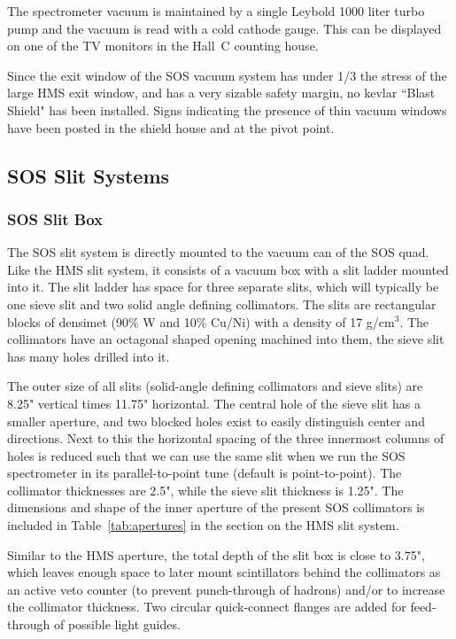 The spectrometer vacuum is maintained by a single Leybold 1000 liter
turbo pump and the vacuum is read with a cold cathode gauge.
This can be displayed on one of the TV monitors in the Hall~C
counting house.

Since the exit window of the SOS vacuum system has under 1/3 the stress of the
large HMS exit window, and has a very sizable safety margin,
no kevlar ``Blast Shield" has been installed.
Signs indicating the presence of thin vacuum windows have been posted in the
shield house and at the pivot point.


\subsection{SOS Slit Systems}

\subsubsection{SOS Slit Box}

The SOS slit system is directly mounted to the vacuum can of the SOS quad.
Like the HMS slit system, it consists of a vacuum box with a slit
ladder mounted into it. The slit ladder has space for three separate slits,
which will typically be one sieve slit and two solid angle defining collimators.
The slits are rectangular blocks of densimet (90\% W and 10\% Cu/Ni)
with a density of 17 g/cm$^3$. The collimators have an octagonal shaped
opening machined into them, the sieve slit has many holes drilled
into it.

The outer size of all slits (solid-angle defining collimators and
sieve slits) are 8.25" vertical times 11.75" horizontal.
The central hole of the sieve slit has a smaller aperture, and two blocked
holes exist to easily distinguish center and directions. Next to this
the horizontal spacing of the three innermost columns of holes is
reduced such that we can use the same slit when we run the SOS spectrometer
in its parallel-to-point tune (default is point-to-point).
The collimator thicknesses are 2.5", while the sieve slit thickness
is 1.25". The dimensions and shape of the inner aperture of the present
SOS collimators is included in Table~\ref{tab:apertures} in the section on the HMS 
 slit system.

Similar to the HMS aperture,
the total depth of the slit box is close to 3.75", which leaves
enough space to later mount scintillators behind the collimators as an active
veto counter (to prevent punch-through of hadrons) and/or to increase
the collimator thickness. Two circular quick-connect flanges are
added for feed-through of possible light guides.

